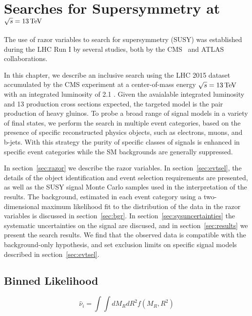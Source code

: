 \chapter{Searches for Supersymmetry at $\sqrt{s}=13\,\text{Te\hspace{-.08em}V}$}

The use of razor variables to search for
supersymmetry (SUSY) was established during the LHC Run I by several
studies, both by the CMS~\cite{razor2010,razorPRL,razorPRD,razor8TeV} and
ATLAS~\cite{Aad:2012naa,ATLAS-dilepton} collaborations. 

In this chapter, we describe an inclusive search using the LHC 2015 dataset
accumulated by the CMS experiment at a center-of-mass energy
$\sqrt{s}=13\,\text{Te\hspace{-.08em}V}$ with an integrated luminosity of 2.1 \fbinv. Given
the avaialable integrated luminosity and 13 \TeV production cross
sections expected, the targeted model is the pair production of heavy gluinos. To probe
a broad range of signal models in a variety of final states, we perform
the search in multiple event categories, based on the presence of
specific reconstructed physics objects, such as electrons, muons, and
b-jets.  With this strategy the purity of specific classes of signals is enhanced in
specific event categories while the SM backgrounds are generally suppressed. 

In section~\ref{sec:razor} we describe the razor variables. In section~\ref{sec:evtsel}, the details of the
object identification and event selection requirements are presented, as well as the
SUSY signal Monte Carlo samples used in the interpretation of the results. The background, estimated 
in each event category using a two-dimensional maximum likelihood fit to the distribution of the data in
the razor variables is discussed in section~\ref{sec:bgr}. In section~\ref{sec:sysuncertainties} 
the systematic uncertainties on the signal
 are discused, and in section~\ref{sec:results} we present the search
 results. We find that the observed data is
 compatible with the background-only hypothesis, and set exclusion limits on specific signal models described in section~\ref{sec:evtsel}.


\section{Binned Likelihood}

\begin{equation}
\hat\nu_i = \int \int dM_R dR^2 f(M_R,R^2)
\end{equation}
